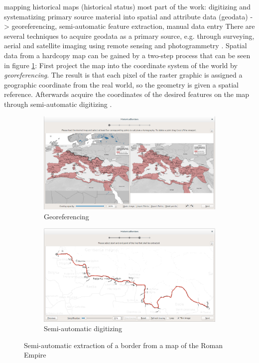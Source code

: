   mapping historical maps (historical status)
    most part of the work: digitizing and systematizing primary source material into spatial and attribute data (geodata)
    -> georeferencing, semi-automatic feature extraction, manual data entry
    \cite[pp. xvii]{knowles2002past}
    There are several techniques to acquire geodata as a primary source, e.g. through surveying, aerial and satellite imaging using remote sensing and photogrammetry
    \cite[p. 148-149, p. 213-216]{bolstad2008gis}.
    Spatial data from a hardcopy map can be gained by a two-step process that can be seen in figure \ref{fig:hibo}:
    First project the map into the coordinate system of the world by \emph{georeferencing}. The result is that each pixel of the raster graphic is assigned a geographic coordinate from the real world, so the geometry is given a spatial reference. Afterwards acquire the coordinates of the desired features on the map through semi-automatic digitizing
    \cite[p. 133-142]{bolstad2008gis}.

    \begin{figure}[ht]
      \centering
      \begin{subfigure}{0.48\textwidth}
        \centering
        \includegraphics[width=0.95\linewidth]{graphics/basics/hibo1.png}
        \caption{Georeferencing}
      \end{subfigure}
      \begin{subfigure}{0.48\textwidth}
        \centering
        \includegraphics[width=0.95\linewidth]{graphics/basics/hibo2.png}
        \caption{Semi-automatic digitizing}
      \end{subfigure}
      \caption{Semi-automatic extraction of a border from a map of the Roman Empire \protect\footnotemark}
      \label{fig:hibo}
    \end{figure}

